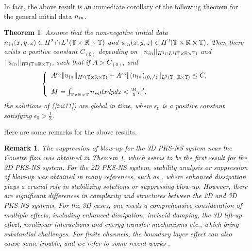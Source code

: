 \documentclass[12pt, reqno]{amsart}
\newtheorem{remark}{Remark}[section]
\newtheorem{theorem}{Theorem}[section]
\numberwithin{equation}{section}
\begin{document}
In fact, the above result is an immediate corollary of the following theorem for the general initial data $n_{\rm in}$.
\begin{theorem}\label{result}
	Assume that the non-negative initial data $ n_{\rm in}(x,y,z)\in H^2\cap L^1(\mathbb{T}\times\mathbb{R}\times\mathbb{T})$
	and $ u_{\rm in}(x,y,z)\in H^2
	(\mathbb{T}\times\mathbb{R}\times\mathbb{T})$.
	Then there exists a positive constant $C_{(0)}$ depending on $||n_{\rm in}||_{H^2\cap L^1(\mathbb{T}\times\mathbb{R}\times\mathbb{T})}$ 
	and $||u_{\rm in}||_{H^2(\mathbb{T}\times\mathbb{R}\times\mathbb{T})}$, such that if $A>C_{(0)}$, and	
	\begin{equation*}
		\left\{
		\begin{array}{lr}
			A^{\epsilon_0}\|u_{\rm in}\|_{H^2(\mathbb{T}\times\mathbb{R}\times\mathbb{T})}
			+A^{\epsilon_0}\|(n_{\rm in})_{(0,\neq)}\|_{L^2(\mathbb{T}\times\mathbb{R}\times\mathbb{T})}\leq C, \\
			\\
			M = \int_{\mathbb{T}\times\mathbb{R}\times\mathbb{T}}n_{\rm in}dxdydz < \frac{24}{5}\pi^2,
		\end{array}
		\right.
	\end{equation*}
	the solutions of {\rm (\ref{ini11})} are global in time, where $\epsilon_0$ is a positive constant satisfying $\epsilon_0>\frac13$.
\end{theorem}
Here are some remarks for the above results.
\begin{remark}
	The suppression of blow-up for the 3D PKS-NS system near the Couette flow was obtained in Theorem \ref{result}, which seems to be the first result for the 3D PKS-NS system.  For the 2D PKS-NS system, stability analysis or suppression of blow-up was obtained in many references, such as \cite{cui1, he05, Li0, Wanglili, zeng}, where enhanced dissipation plays a crucial role in stabilizing solutions or suppressing blow-up. However, there are significant differences in complexity and structures between the 2D and 3D PKS-NS systems. For the 3D cases, one needs a comprehensive consideration of multiple effects, including enhanced dissipation, inviscid damping, the 3D lift-up effect, nonlinear interactions and energy transfer mechanisms etc.,  which bring substantial challenges. For finite channels, the boundary layer effect can also cause some trouble, and we refer to some recent works \cite{CLTZ, Chen0, Chen1}.
	
\end{remark}
\end{document}
